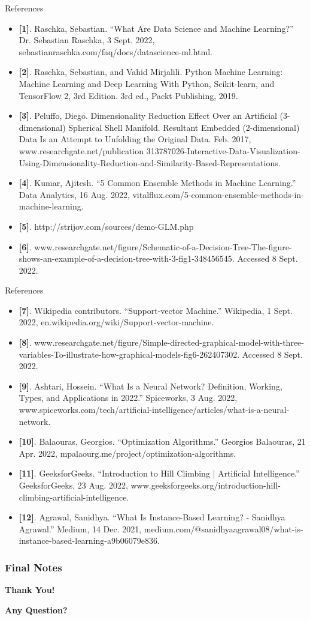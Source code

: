 \documentclass[compress,oilve]{beamer}
\begin{document}
\begin{frame}{References}
\begin{itemize}
\item{} \textbf{[1]}. Raschka, Sebastian. “What Are Data Science and Machine Learning?” Dr. Sebastian Raschka, 3 Sept. 2022, sebastianraschka.com/faq/docs/datascience-ml.html.
\item{} \textbf{[2]}. Raschka, Sebastian, and Vahid Mirjalili. Python Machine Learning: Machine Learning and Deep Learning With Python, Scikit-learn, and TensorFlow 2, 3rd Edition. 3rd ed., Packt Publishing, 2019.
\item{} \textbf{[3]}. Peluffo, Diego. Dimensionality Reduction Effect Over an Artificial (3-dimensional) Spherical Shell Manifold. Resultant Embedded (2-dimensional) Data Is an Attempt to Unfolding the Original Data. Feb. 2017, www.researchgate.net/publication 313787026-Interactive-Data-Visualization-Using-Dimensionality-Reduction-and-Similarity-Based-Representations.
\item{} \textbf{[4]}. Kumar, Ajitesh. “5 Common Ensemble Methods in Machine Learning.” Data Analytics, 16 Aug. 2022, vitalflux.com/5-common-ensemble-methods-in-machine-learning.
\item{} \textbf{[5]}. http://strijov.com/sources/demo-GLM.php
\item{} \textbf{[6]}. www.researchgate.net/figure/Schematic-of-a-Decision-Tree-The-figure-shows-an-example-of-a-decision-tree-with-3-fig1-348456545. Accessed 8 Sept. 2022.
\end{itemize}
\end{frame}


\begin{frame}{References}
\begin{itemize}
\item{} \textbf{[7]}. Wikipedia contributors. “Support-vector Machine.” Wikipedia, 1 Sept. 2022, en.wikipedia.org/wiki/Support-vector-machine.
\item{} \textbf{[8]}. www.researchgate.net/figure/Simple-directed-graphical-model-with-three-variables-To-illustrate-how-graphical-models-fig6-262407302. Accessed 8 Sept. 2022.
\item{} \textbf{[9]}. Ashtari, Hossein. “What Is a Neural Network? Definition, Working, Types, and Applications in 2022.” Spiceworks, 3 Aug. 2022, www.spiceworks.com/tech/artificial-intelligence/articles/what-is-a-neural-network.
\item{} \textbf{[10]}. Balaouras, Georgios. “Optimization Algorithms.” Georgios Balaouras, 21 Apr. 2022, mpalaourg.me/project/optimization-algorithms.
\item{} \textbf{[11]}. GeeksforGeeks. “Introduction to Hill Climbing | Artificial Intelligence.” GeeksforGeeks, 23 Aug. 2022, www.geeksforgeeks.org/introduction-hill-climbing-artificial-intelligence.
\item{} \textbf{[12]}. Agrawal, Sanidhya. “What Is Instance-Based Learning? - Sanidhya Agrawal.” Medium, 14 Dec. 2021, medium.com/@sanidhyaagrawal08/what-is-instance-based-learning-a9b06079e836.
\end{itemize}
\end{frame}


\frametitle{Final Notes}
\centering
\vspace{50 pt}
\textbf{Thank You!}
\vspace{50pt}

\textbf{Any Question?}
\end{document}
